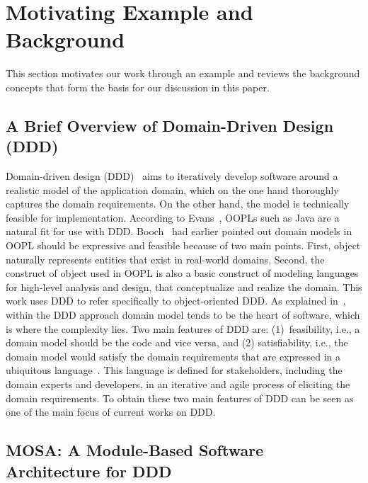 \section{Motivating Example and Background} \label{sect:background}
This section motivates our work through an example and reviews the background concepts that form the basis for our discussion in this paper.


\subsection{A Brief Overview of Domain-Driven Design (DDD)}
\label{sect:bg-arch} %

Domain-driven design (DDD)~\cite{evans_domain-driven_2004} aims to iteratively develop software around a realistic model of the application domain, which on the one hand thoroughly captures the domain requirements. On the other hand, the model is technically feasible for implementation. According to Evans~\cite{evans_domain-driven_2004}, OOPLs such as Java are a natural fit for use with DDD. Booch~\cite{booch_object-oriented_1986} had earlier pointed out domain models in OOPL should be expressive and feasible because of two main points. First, object naturally represents entities that exist in real-world domains. Second, the construct of object used in OOPL is also a basic construct of modeling languages for high-level analysis and design, that conceptualize and realize the domain. This work uses DDD to refer specifically to object-oriented DDD. As explained in~\cite{evans_domain-driven_2004}, within the DDD approach domain model tends to be the heart of software, which is where the complexity lies. Two main features of DDD are: (1)~feasibility, i.e., a domain model should be the code and vice versa, and (2) satisfiability, i.e., the domain model would satisfy the domain requirements that are expressed in a ubiquitous language~\cite{evans_domain-driven_2004}. This language is defined for stakeholders, including the domain experts and developers, in an iterative and agile process of eliciting the domain requirements. To obtain these two main features of DDD can be seen as one of the main focus of current works on DDD. 

\subsection{MOSA: A Module-Based Software Architecture for DDD}
\label{sect:bg-arch} %

